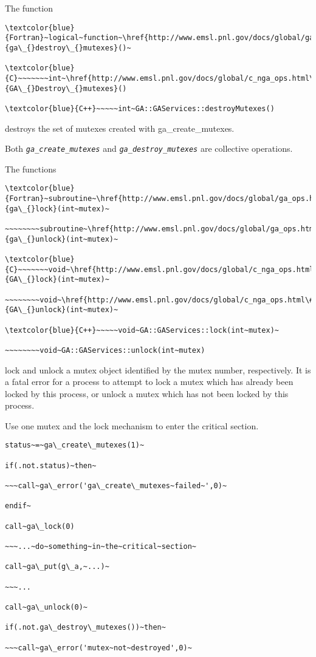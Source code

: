 The function
\begin{verbatim}
\textcolor{blue}{Fortran}~logical~function~\href{http://www.emsl.pnl.gov/docs/global/ga_ops.html\#ga_destroy_mutex}{ga\_{}destroy\_{}mutexes}()~

\textcolor{blue}{C}~~~~~~~int~\href{http://www.emsl.pnl.gov/docs/global/c_nga_ops.html\#ga_destroy_mutexes}{GA\_{}Destroy\_{}mutexes}()

\textcolor{blue}{C++}~~~~~int~GA::GAServices::destroyMutexes()
\end{verbatim}
destroys the set of mutexes created with ga\_create\_mutexes.

Both \texttt{\emph{ga\_create\_mutexes}} and \texttt{\emph{ga\_destroy\_mutexes}}
are collective operations.

The functions
\begin{verbatim}
\textcolor{blue}{Fortran}~subroutine~\href{http://www.emsl.pnl.gov/docs/global/ga_ops.html\#ga_lock}{ga\_{}lock}(int~mutex)~

~~~~~~~~subroutine~\href{http://www.emsl.pnl.gov/docs/global/ga_ops.html\#ga_unlock}{ga\_{}unlock}(int~mutex)~

\textcolor{blue}{C}~~~~~~~void~\href{http://www.emsl.pnl.gov/docs/global/c_nga_ops.html\#ga_lock}{GA\_{}lock}(int~mutex)~

~~~~~~~~void~\href{http://www.emsl.pnl.gov/docs/global/c_nga_ops.html\#ga_unlock}{GA\_{}unlock}(int~mutex)~

\textcolor{blue}{C++}~~~~~void~GA::GAServices::lock(int~mutex)~

~~~~~~~~void~GA::GAServices::unlock(int~mutex)
\end{verbatim}
lock and unlock a mutex object identified by the mutex number, respectively.
It is a fatal error for a process to attempt to lock a mutex which
has already been locked by this process, or unlock a mutex which has
not been locked by this process.

\emph{}\underbar{ }\emph{}\underbar{:}

Use one mutex and the lock mechanism to enter the critical section.
\begin{verbatim}
status~=~ga\_create\_mutexes(1)~

if(.not.status)~then~

~~~call~ga\_error('ga\_create\_mutexes~failed~',0)~

endif~

call~ga\_lock(0)

~~~...~do~something~in~the~critical~section~

call~ga\_put(g\_a,~...)~

~~~...

call~ga\_unlock(0)~

if(.not.ga\_destroy\_mutexes())~then~

~~~call~ga\_error('mutex~not~destroyed',0)~
\end{verbatim}

